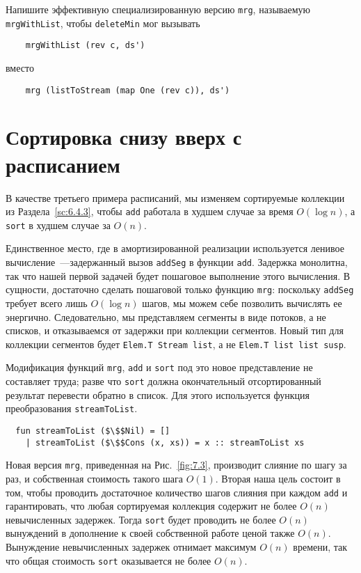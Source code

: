 \begin{exercise}\label{ex:7.4}
  Напишите эффективную специализированную версию \lstinline!mrg!,
  называемую \lstinline!mrgWithList!, чтобы \lstinline!deleteMin! мог
  вызывать
  \begin{lstlisting}
    mrgWithList (rev c, ds')
  \end{lstlisting}
  вместо
  \begin{lstlisting}
    mrg (listToStream (map One (rev c)), ds')
  \end{lstlisting}
\end{exercise}

\section{Сортировка снизу вверх с расписанием}

В качестве третьего примера расписаний, мы изменяем сортируемые
коллекции из Раздела~\ref{sc:6.4.3}, чтобы \lstinline!add! работала в
худшем случае за время $O(\log n)$, а \lstinline!sort! в худшем случае за $O(n)$.

Единственное место, где в амортизированной реализации используется
ленивое вычисление~---задержанный вызов \lstinline!addSeg! в функции
\lstinline!add!. Задержка монолитна, так что нашей первой задачей
будет пошаговое выполнение этого вычисления. В сущности, достаточно
сделать пошаговой только функцию \lstinline!mrg!: поскольку
\lstinline!addSeg! требует всего лишь $O(\log n)$ шагов, мы можем себе
позволить вычислять ее энергично.  Следовательно, мы представляем
сегменты в виде потоков, а не списков, и отказываемся от задержки при
коллекции сегментов. Новый тип для коллекции сегментов будет
\lstinline!Elem.T Stream list!, а не \lstinline!Elem.T list list susp!.

Модификация функций \lstinline!mrg!, \lstinline!add! и
\lstinline!sort! под это новое представление не составляет труда;
разве что \lstinline!sort! должна окончательный отсортированный
результат перевести обратно в список. Для этого используется функция
преобразования \lstinline!streamToList!.
\begin{lstlisting}
  fun streamToList ($\$$Nil) = []
    | streamToList ($\$$Cons (x, xs)) = x :: streamToList xs
\end{lstlisting}

Новая версия \lstinline!mrg!, приведенная на Рис.~\ref{fig:7.3},
производит слияние по шагу за раз, и собственная стоимость такого шага
$O(1)$. Вторая наша цель состоит в том, чтобы проводить достаточное
количество шагов слияния при каждом \lstinline!add! и
гарантировать, что любая сортируемая коллекция содержит не более
$O(n)$ невычисленных задержек. Тогда \lstinline!sort! будет проводить
не более $O(n)$ вынуждений в дополнение к своей собственной работе
ценой также $O(n)$. Вынуждение невычисленных задержек отнимает
максимум $O(n)$ времени, так что общая стоимость \lstinline!sort!
оказывается не более $O(n)$.

